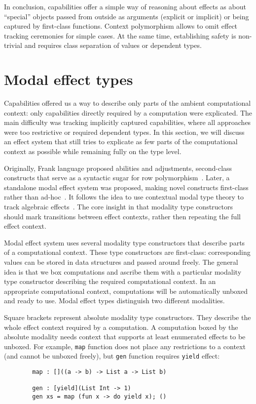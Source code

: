 \documentclass[conference]{IEEEtran}
\begin{document}
    In conclusion, capabilities offer a simple way of reasoning about effects as about ``special'' objects passed from outside as arguments (explicit or implicit) or being captured by first-class functions.
    Context polymorphism allows to omit effect tracking ceremonies for simple cases.
    At the same time, establishing safety is non-trivial and requires class separation of values or dependent types.


    \section{Modal effect types} \label{sec:modal}

    Capabilities offered us a way to describe only parts of the ambient computational context: only capabilities directly required by a computation were explicated.
    The main difficulty was tracking implicitly captured capabilities, where all approaches were too restrictive or required dependent types.
    In this section, we will discuss an effect system that still tries to explicate as few parts of the computational context as possible while remaining fully on the type level.

    Originally, Frank language proposed abilities and adjustments, second-class constructs that serve as a syntactic sugar for row polymorphism~\cite{lindley2017do, convent2020doo}.
    Later, a standalone modal effect system was proposed, making novel constructs first-class rather than ad-hoc~\cite{tang2024modal}.
    It follows the idea to use contextual modal type theory to track algebraic effects~\cite{zyuzin2021contextual}.
    The core insight in that modality type constructors should mark transitions between effect contexts, rather then repeating the full effect context.

    Modal effect system uses several modality type constructors that describe parts of a computational context.
    These type constructors are first-class: corresponding values can be stored in data structures and passed around freely.
    The general idea is that we box computations and ascribe them with a particular modality type constructor describing the required computational context.
    In an appropriate computational context, computations will be automatically unboxed and ready to use.
    Modal effect types distinguish two different modalities.

    Square brackets represent absolute modality type constructors.
    They describe the whole effect context required by a computation.
    A computation boxed by the absolute modality needs context that supports at least enumerated effects to be unboxed.
    For example, \texttt{map} function does not place any restrictions to a context (and cannot be unboxed freely), but \texttt{gen} function requires \texttt{yield} effect:
    \begin{verbatim}
        map : []((a -> b) -> List a -> List b)

        gen : [yield](List Int -> 1)
        gen xs = map (fun x -> do yield x); ()
    \end{verbatim}
\end{document}
